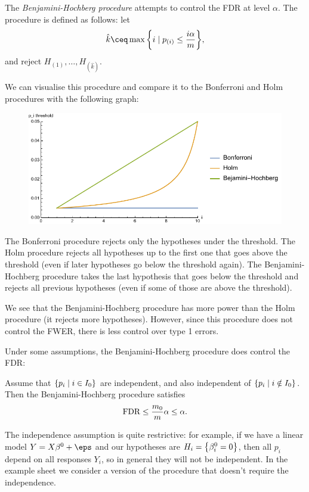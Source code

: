 \begin{example}
	The \emph{Benjamini-Hochberg procedure} attempts to control the FDR at level $\alpha$. The procedure is defined as follows: let
	\[
	\hat k \ceq \max \qty{i \mid p_{(i)} \leq \frac{i\alpha}{m}},
	\]
	and reject $H_{(1)}, \dotsc, H_{(\hat k)}$. 
	
	We can visualise this procedure and compare it to the Bonferroni and Holm procedures with the following graph:
	\begin{figure}[H]
		\centering
		\includegraphics[width=.5\paperwidth]{multiple_testing_plot.pdf}
	\end{figure}
The Bonferroni procedure rejects only the hypotheses under the threshold. The Holm procedure rejects all hypotheses up to the first one that goes above the threshold (even if later hypotheses go below the threshold again). The Benjamini-Hochberg procedure takes the last hypothesis that goes below the threshold and rejects all previous hypotheses (even if some of those are above the threshold).

We see that the Benjamini-Hochberg procedure has more power than the Holm procedure (it rejects more hypotheses). However, since this procedure does not control the FWER, there is less control over type 1 errors. 

Under some assumptions, the Benjamini-Hochberg procedure does control the FDR: 
\begin{theorem}
	Assume that $\qty{p_i \mid i \in I_0}$ are independent, and also independent of $\qty{p_i \mid i \notin I_0}$. Then the Benjamini-Hochberg procedure satisfies
	\[
	\operatorname{FDR}\leq \frac{m_0}{m}\alpha \leq\alpha. 
	\]
\end{theorem}

\begin{remark}
	The independence assumption is quite restrictive: for example, if we have a linear model $Y = X\beta^0 + \eps$ and our hypotheses are $H_i = \qty{\beta_i^0 = 0}$, then all $p_i$ depend on all responses $Y_i$, so in general they will not be independent. In the example sheet we consider a version of the procedure that doesn't require the independence. 
\end{remark}


\end{example}

